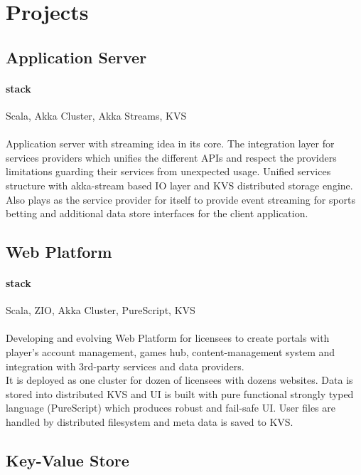 \section{Projects}

\subsection{Application Server}
\paragraph{stack} Scala, Akka Cluster, Akka Streams, KVS
\paragraph{}
Application server with streaming idea in its core. The integration layer for services providers which unifies the different APIs and respect the providers limitations guarding their services from unexpected usage. Unified services structure with akka-stream based IO layer and KVS distributed storage engine. Also plays as the service provider for itself to provide event streaming for sports betting and additional data store interfaces for the client application.

\subsection{Web Platform}
\paragraph{stack} Scala, ZIO, Akka Cluster, PureScript, KVS
\paragraph{}
Developing and evolving Web Platform for licensees to create portals with player's account management, games hub, content-management system and integration with 3rd-party services and data providers.\\
It is deployed as one cluster for dozen of licensees with dozens websites. Data is stored into distributed KVS and UI is built with pure functional strongly typed language (PureScript) which produces robust and fail-safe UI. User files are handled by distributed filesystem and meta data is saved to KVS.

\subsection{Key-Value Store}
